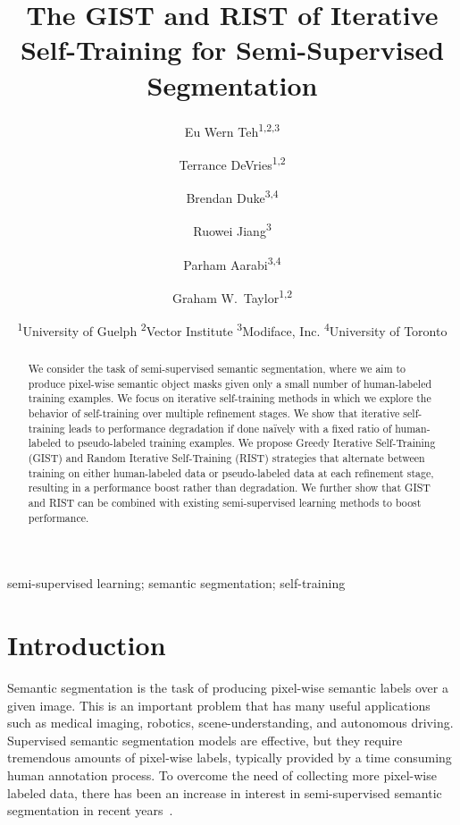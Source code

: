 \documentclass[10pt, conference, compsocconf]{IEEEtran}
\begin{document}
\title{The GIST and RIST of Iterative Self-Training for Semi-Supervised Segmentation}


\author{Eu Wern Teh\textsuperscript{1,2,3}
	\and
	Terrance DeVries\textsuperscript{1,2}
	\and
	Brendan Duke\textsuperscript{3,4}
	\and
	Ruowei Jiang\textsuperscript{3}
	\and
	Parham Aarabi\textsuperscript{3,4}
	\and
	Graham W.~Taylor\textsuperscript{1,2}
	\and
	\hspace{3.5em} \textsuperscript{1}University of Guelph\qquad
	\textsuperscript{2}Vector Institute\qquad
	\textsuperscript{3}Modiface, Inc.\qquad
    \textsuperscript{4}University of Toronto
}




\maketitle


\begin{abstract}
We consider the task of semi-supervised semantic segmentation, where we aim to produce pixel-wise semantic object masks given only a small number of human-labeled training examples. We focus on iterative self-training methods in which we explore the behavior of self-training over multiple refinement stages. We show that iterative self-training leads to performance degradation if done na\"ively with a fixed ratio of human-labeled to pseudo-labeled training examples. We propose Greedy Iterative Self-Training (GIST) and Random Iterative Self-Training (RIST) strategies that
alternate between training on either human-labeled data or pseudo-labeled data at each refinement stage, resulting in a performance boost rather than degradation.
We further show that GIST and RIST can be combined with existing semi-supervised learning methods to boost performance. 

\end{abstract}

\begin{IEEEkeywords}
semi-supervised learning; semantic segmentation; self-training

\end{IEEEkeywords}


\IEEEpeerreviewmaketitle


\section{Introduction}

Semantic segmentation is the task of producing pixel-wise semantic labels over a given image.
This is an important problem that has many useful applications such as medical imaging, robotics, scene-understanding, and autonomous driving. Supervised semantic segmentation models are effective, but they require tremendous amounts of pixel-wise labels, typically provided by a time consuming human annotation process. To overcome the need of collecting more pixel-wise labeled data, there has been
an increase in interest in
semi-supervised semantic segmentation in recent years~\cite{souly2017semi,hung2019adversarial, mittal2019semi,mendelsemi,french2019semi,olsson2020classmix,Ouali_2020_CVPR,alonso2021semi}.
\end{document}
